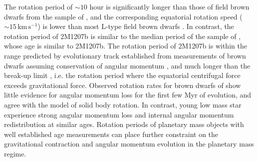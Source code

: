 \documentclass[apj]{emulateapj}
\newcommand{\revise}[1]{\textbf{{\color{cyan}{#1}}}}
\renewcommand{\revise}{}
\newcommand{\reviseTwo}[1]{\textbf{{\color{cyan}{#1}}}}
\renewcommand{\reviseTwo}{}
\begin{document}
\revise{ The rotation period of $\sim 10$
  hour is significantly longer than those of field brown dwarfs from the sample
  of \cite{Metchev2015}, and the corresponding equatorial rotation
  speed ($\sim 15\, \mathrm{km\,s^{-1}}$) is lower than most L-type field
  brown dwarfs \citep[][]{Reiners2008}.
  In contrast, the rotation period of 2M1207b is similar to the median period
  of the sample of \cite{Scholz2015}, whose age is similar
  to 2M1207b. The rotation period of 2M1207b
  is within the range predicted by evolutionary track
  established from measurements of brown dwarfs assuming conservation
  of angular momentum \citep[see Fig. 4 of ][]{Scholz2015}, and much longer
  than the break-up limit \citep{Marley2011}, i.e. the rotation period where the
  equatorial centrifugal force exceeds gravitational force. \reviseTwo{Observed
  rotation rates for brown dwarfs of show little
  evidence for angular momentum loss 
  \citep{Bouvier2014, Scholz2015} for the first few Myr of evolution, and agree with the model of solid
  body rotation. In contrast, young low
  mass star experience strong angular momentum loss and internal
  angular momentum redistribution at similar ages.} Rotation periods of
planetary mass objects with well established age measurements can
\reviseTwo{place  further constraint on the gravitational contraction and
  angular momentum evolution in the planetary mass regime.}}
\end{document}
